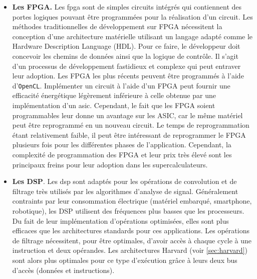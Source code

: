 \begin{enumerate}
\begin{itemize}
                    \item\textbf{Les FPGA.}  Les \gls{fpga} sont de simples circuits intégrés qui contiennent des portes logiques pouvant être programmées pour la réalisation d'un circuit. 
                    Les méthodes traditionnelles de développement sur FPGA nécessitent la conception d'une architecture matérielle utilisant un langage adapté comme le Hardware Description Language (HDL). Pour ce faire, le développeur doit concevoir les chemins de données ainsi que la logique de contrôle. Il s'agit d'un processus de développement fastidieux et complexe qui peut entraver leur adoption. Les FPGA les plus récents peuvent être programmés à l'aide d'\verb|OpenCL|.
                    Implémenter un circuit à l'aide d'un FPGA peut fournir une efficacité énergétique légèrement inférieure à celle obtenue par une implémentation d'un \gls{asic}. Cependant, le fait que les FPGA soient programmables leur donne un avantage sur les ASIC, car le même matériel peut être reprogrammé en un nouveau circuit. Le temps de reprogrammation étant relativement faible, il peut être intéressant de reprogrammer le FPGA plusieurs fois pour les différentes phases de l'application. Cependant, la complexité de programmation des FPGA et leur prix très élevé sont les principaux freins pour leur adoption dans les supercalculateurs.        
                    
                    \item\textbf{Les DSP}. Les \gls{dsp} sont adaptés pour les opérations de convolution et de filtrage très utilisés par les algorithmes d'analyse de signal. Généralement contraints par leur consommation électrique (matériel embarqué, smartphone, robotique), les DSP utilisent des fréquences plus basses que les processeurs. Du fait de leur implémentation d'opérations optimisées, elles sont plus efficaces que les architectures standards pour ces applications. Les opérations de filtrage nécessitent, pour être optimales, d'avoir accès à chaque cycle à une instruction et deux opérandes. Les architectures Harvard (voir \autoref{sec:harvard}) sont alors plus optimales pour ce type d'exécution grâce à leurs deux bus d'accès (données et instructions).
                     
             \end{itemize}
             

\end{enumerate}
